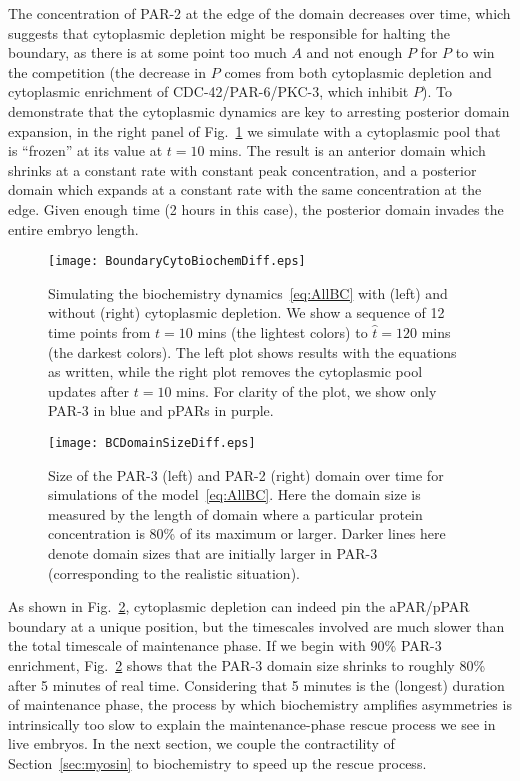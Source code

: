\documentclass[11pt]{article}
\newcommand{\6}[1]{#1_{\text{6}}}
\newcommand{\3}[1]{#1_{\text{3}}}
\begin{document}
The concentration of PAR-2 at the edge of the domain decreases over time, which suggests that cytoplasmic depletion might be responsible for halting the boundary, as there is at some point too much $A$ and not enough $P$ for $P$ to win the competition (the decrease in $P$ comes from both cytoplasmic depletion and cytoplasmic enrichment of CDC-42/PAR-6/PKC-3, which inhibit $P$). To demonstrate that the cytoplasmic dynamics are key to arresting posterior domain expansion, in the right panel of Fig.\ \ref{fig:BoundaryDiff} we simulate with a cytoplasmic pool that is ``frozen'' at its value at $t = 10$ mins. The result is an anterior domain which shrinks at a constant rate with constant peak concentration, and a posterior domain which expands at a constant rate with the same concentration at the edge. Given enough time (2 hours in this case), the posterior domain invades the entire embryo length. 



\begin{figure}
\centering
\texttt{[image: BoundaryCytoBiochemDiff.eps]}
\caption{\label{fig:BoundaryDiff}Simulating the biochemistry dynamics\ \eqref{eq:AllBC} with (left) and without (right) cytoplasmic depletion. We show a sequence of 12 time points from $t = 10$ mins (the lightest colors) to $\hat t = 120$ mins (the darkest colors). The left plot shows results with the equations as written, while the right plot removes the cytoplasmic pool updates after $t=10$ mins. For clarity of the plot, we show only PAR-3 in blue and pPARs in purple.}
\end{figure}

\begin{figure}
\centering
\texttt{[image: BCDomainSizeDiff.eps]}
\caption{\label{fig:BCDSD} Size of the PAR-3 (left) and PAR-2 (right) domain over time for simulations of the model\ \eqref{eq:AllBC}. Here the domain size is measured by the length of domain where a particular protein concentration is 80\% of its maximum or larger. Darker lines here denote domain sizes that are initially larger in PAR-3 (corresponding to the realistic situation).}
\end{figure}


As shown in Fig.\ \ref{fig:BCDSD}, cytoplasmic depletion can indeed pin the aPAR/pPAR boundary at a unique position, but the timescales involved are much slower than the total timescale of maintenance phase. If we begin with 90\% PAR-3 enrichment, Fig.\ \ref{fig:BCDSD} shows that the PAR-3 domain size shrinks to roughly 80\% after 5 minutes of real time. Considering that 5 minutes is the (longest) duration of maintenance phase, the process by which biochemistry amplifies asymmetries is intrinsically too slow to explain the maintenance-phase rescue process we see in live embryos. In the next section, we couple the contractility of Section\ \ref{sec:myosin} to biochemistry to speed up the rescue process. 
\end{document}
